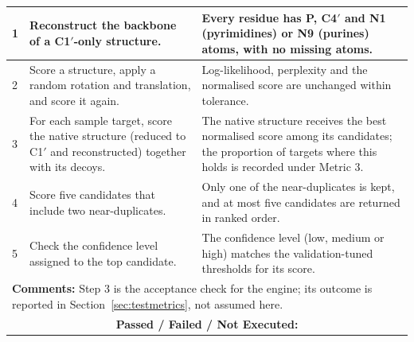 \documentclass{FastFyp}
\begin{document}
{\begin{longtable}{|p{2.4cm}|p{4.6cm}|p{2.4cm}|p{3.8cm}|}
1 & Reconstruct the backbone of a C1$'$-only structure. & \multicolumn{2}{p{6.64cm}|}{Every residue has P, C4$'$ and N1 (pyrimidines) or N9 (purines) atoms, with no missing atoms.} \\ \hline
2 & Score a structure, apply a random rotation and translation, and score it again. & \multicolumn{2}{p{6.64cm}|}{Log-likelihood, perplexity and the normalised score are unchanged within tolerance.} \\ \hline
3 & For each sample target, score the native structure (reduced to C1$'$ and reconstructed) together with its decoys. & \multicolumn{2}{p{6.64cm}|}{The native structure receives the best normalised score among its candidates; the proportion of targets where this holds is recorded under Metric 3.} \\ \hline
4 & Score five candidates that include two near-duplicates. & \multicolumn{2}{p{6.64cm}|}{Only one of the near-duplicates is kept, and at most five candidates are returned in ranked order.} \\ \hline
5 & Check the confidence level assigned to the top candidate. & \multicolumn{2}{p{6.64cm}|}{The confidence level (low, medium or high) matches the validation-tuned thresholds for its score.} \\ \hline
\multicolumn{4}{|p{14.51cm}|}{\textbf{Comments:} Step 3 is the acceptance check for the engine; its outcome is reported in Section~\ref{sec:testmetrics}, not assumed here.} \\ \hline
\multicolumn{4}{|c|}{\textbf{Passed / Failed / Not Executed:}} \\ \hline
\end{longtable}
}
\end{document}
